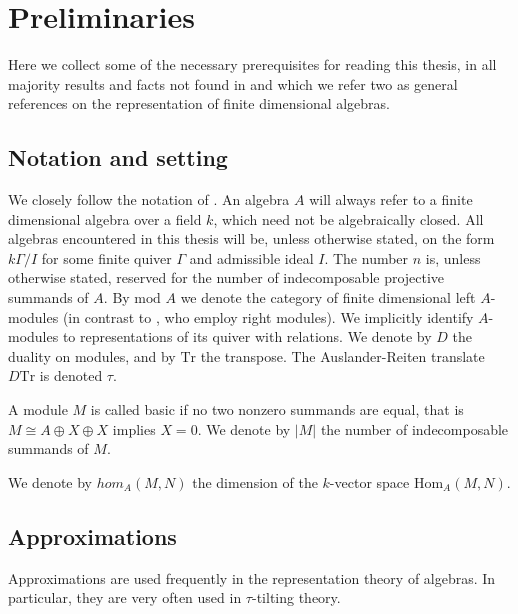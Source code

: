 \documentclass[]{article}
\theoremstyle{definition}
\newcommand{\mo}{\ensuremath{\text{mod }}}
\newcommand{\tu}{\ensuremath{\tau}}
\begin{document}
\section{Preliminaries}
Here we collect some of the necessary prerequisites for reading this thesis, in all majority results and facts not found in \cite{auslander_reiten_smalo_1995} and \cite{assem_skowronski_simson_2006} which we refer two as general references on the representation of finite dimensional algebras.

\subsection{Notation and setting}
We closely follow the notation of \cite{assem_skowronski_simson_2006}. An algebra $A$ will always refer to a finite dimensional algebra over a field $k$, which need not be algebraically closed. All algebras encountered in this thesis will be, unless otherwise stated, on the form $k\Gamma/I$ for some finite quiver $\Gamma$ and admissible ideal $I$. The number $n$ is, unless otherwise stated, reserved for the number of indecomposable projective summands of $A$. By $\mo A$ we denote the category of finite dimensional left $A$-modules (in contrast to \cite{assem_skowronski_simson_2006}, who employ right modules). We implicitly identify $A$-modules to representations of its quiver with relations. We denote by $D$ the duality on modules, and by $\text{Tr}$ the transpose. The Auslander-Reiten translate $D\text{Tr}$ is denoted $\tau$.

A module $M$ is called basic if no two nonzero summands are equal, that is $M \cong A \oplus X \oplus X$ implies $X = 0$. We denote by $|M|$ the number of indecomposable summands of $M$. 

We denote by $hom_A(M,N)$ the dimension of the $k$-vector space $\text{Hom}_A(M,N)$.

\subsection{Approximations}
Approximations are used frequently in the representation theory of algebras. In particular, they are very often used in \tu-tilting theory.
\end{document}
